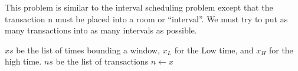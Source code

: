 \documentclass[12pt]{article}
\newenvironment{problem}[2][Problem]{\begin{trivlist}
\item[\hskip \labelsep {\bfseries #1}\hskip \labelsep {\bfseries #2.}]}{\end{trivlist}}
\begin{document}
\begin{problem}{4.16}
    This problem is similar to the interval scheduling problem except that the
    transaction n must be placed into a room or ``interval''. We must try to put
    as many transactions into as many intervals as possible.
    \begin{algorithmic}
        \Require $xs$ be the list of times bounding a window, $x_L$ for the Low time, and
        $x_H$ for the high time. 
        \Require $ns$ be the list of transactions 
                    \State $n \gets x$ 
                \EndIf
            \EndFor
        \EndFor
\end{algorithmic}
\end{problem}
 
\end{document}
